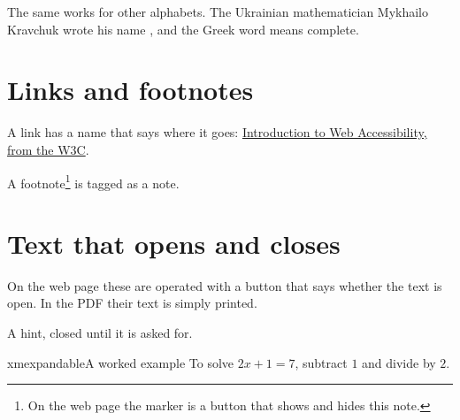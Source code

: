 \documentclass{ximera}
\begin{document}
The same works for other alphabets. The Ukrainian mathematician Mykhailo
Kravchuk wrote his name , and the Greek word
 means complete.

\section{Links and footnotes}

A link has a name that says where it goes:
\href{https://www.w3.org/WAI/fundamentals/accessibility-intro/}{Introduction to Web Accessibility, from the W3C}.

A footnote\footnote{On the web page the marker is a button that shows and
hides this note.} is tagged as a note.

\section{Text that opens and closes}

On the web page these are operated with a button that says whether the
text is open. In the PDF their text is simply printed.

\begin{hint}
A hint, closed until it is asked for.
\end{hint}

\begin{expandable}{xmexpandable}{A worked example}
To solve $2x+1=7$, subtract $1$ and divide by $2$.
\end{expandable}
\end{document}
